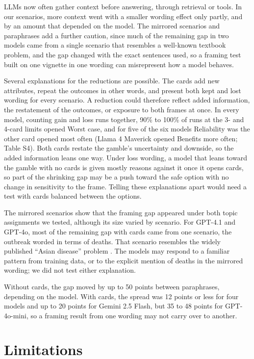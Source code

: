 \documentclass[11pt]{article}
\begin{document}
LLMs now often gather context before answering, through retrieval or tools. In our scenarios, more context went with a smaller wording effect only partly, and by an amount that depended on the model. The mirrored scenarios and paraphrases add a further caution, since much of the remaining gap in two models came from a single scenario that resembles a well-known textbook problem, and the gap changed with the exact sentences used, so a framing test built on one vignette in one wording can misrepresent how a model behaves.

Several explanations for the reductions are possible. The cards add new attributes, repeat the outcomes in other words, and present both kept and lost wording for every scenario. A reduction could therefore reflect added information, the restatement of the outcomes, or exposure to both frames at once. In every model, counting gain and loss runs together, 90\% to 100\% of runs at the 3- and 4-card limits opened Worst case, and for five of the six models Reliability was the other card opened most often (Llama 4 Maverick opened Benefits more often; Table S4). Both cards restate the gamble's uncertainty and downside, so the added information leans one way. Under loss wording, a model that leans toward the gamble with no cards is given mostly reasons against it once it opens cards, so part of the shrinking gap may be a push toward the safe option with no change in sensitivity to the frame. Telling these explanations apart would need a test with cards balanced between the options.

The mirrored scenarios show that the framing gap appeared under both topic assignments we tested, although its size varied by scenario. For GPT-4.1 and GPT-4o, most of the remaining gap with cards came from one scenario, the outbreak worded in terms of deaths. That scenario resembles the widely published ``Asian disease'' problem \citep{tversky1981framing}. The models may respond to a familiar pattern from training data, or to the explicit mention of deaths in the mirrored wording; we did not test either explanation.

Without cards, the gap moved by up to 50 points between paraphrases, depending on the model. With cards, the spread was 12 points or less for four models and up to 20 points for Gemini 2.5 Flash, but 35 to 48 points for GPT-4o-mini, so a framing result from one wording may not carry over to another.

\section{Limitations}
\end{document}
